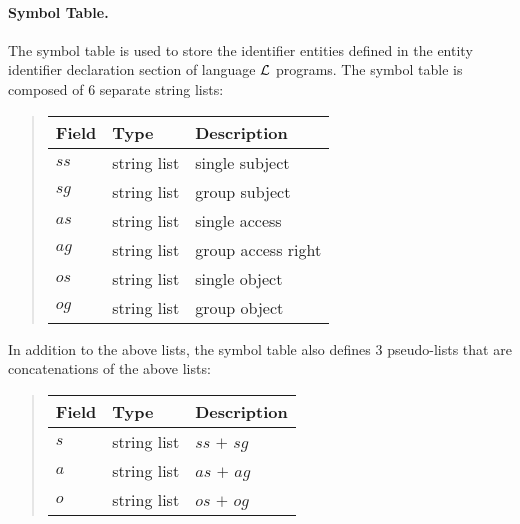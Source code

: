 \documentclass[10pt, twocolumn]{article}
\begin{document}
        \paragraph{Symbol Table.}

          The symbol table is used to store the identifier entities defined in
          the entity identifier declaration section of language ${\cal L}$
          programs. The symbol table is composed of 6 separate string lists:

          \begin{quote}
            \begin{tabular}[t]{|l|l|l|}
              \hline
              \textbf{Field} & \textbf{Type} & \textbf{Description} \\
              \hline
              $ss$ & string list & single subject \\
              \hline
              $sg$ & string list & group subject \\
              \hline
              $as$ & string list & single access \\
              \hline
              $ag$ & string list & group access right \\
              \hline
              $os$ & string list & single object \\
              \hline
              $og$ & string list & group object \\
              \hline
            \end{tabular}
          \end{quote}

          In addition to the above lists, the symbol table also defines 3
          pseudo-lists that are concatenations of the above lists:

          \begin{quote}
            \begin{tabular}[t]{|l|l|l|}
              \hline
              \textbf{Field} & \textbf{Type} & \textbf{Description} \\
              \hline
              $s$ & string list & $ss$ $+$ $sg$ \\
              \hline
              $a$ & string list & $as$ $+$ $ag$ \\
              \hline
              $o$ & string list & $os$ $+$ $og$ \\
              \hline
            \end{tabular}
          \end{quote}
\end{document}
